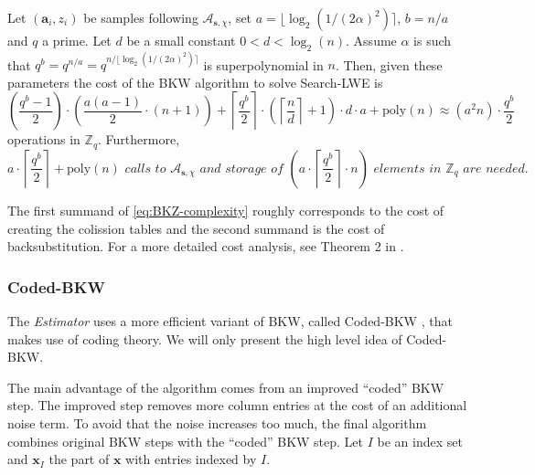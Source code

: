 \begin{theorem}
  Let $(\mathbf{a}_i, z_i)$ be samples following $\mathcal{A}_{\mathbf{s}, \chi}$, set $a = \lfloor \log_2(1/(2\alpha)^2)\rceil$, $b = n/a$ and $q$ a prime. Let $d$ be a small constant $0 < d < \log_2(n)$. Assume $\alpha$ is such that $q^b = q^{n/a} = q^{n/\lfloor \log_2(1/(2\alpha)^2)\rceil}$ is superpolynomial in $n$. Then, given these parameters the cost of the BKW algorithm to solve Search-LWE is
  \begin{equation}\label{eq:BKZ-complexity}
    \left(\frac{q^b-1}{2}\right) \cdot \left(\frac{a(a-1)}{2} \cdot (n + 1) \right) + \left\lceil\frac{q^b}{2}\right\rceil \cdot \left(\left\lceil\frac{n}{d}\right\rceil + 1\right) \cdot d \cdot a + \text{poly}(n) \approx (a^2 n) \cdot \frac{q^b}{2}
  \end{equation}
  operations in $\mathbb{Z}_q$. Furthermore,
  \begin{equation}
    a \cdot \left\lceil\frac{q^b}{2}\right\rceil + \text{poly}(n)\textit{ calls to } \mathcal{A}_{\mathbf{s}, \chi}\textit{ and storage of }  \left(a \cdot \left\lceil\frac{q^b}{2}\right\rceil \cdot n\right) \textit{ elements in } \mathbb{Z}_q \textit{ are needed.}
  \end{equation}
\end{theorem}

The first summand of \cref{eq:BKZ-complexity} roughly corresponds to the cost of creating the colission tables and the second summand is the cost of backsubstitution. For a more detailed cost analysis, see Theorem 2 in \cite{ACFFP15a}.


\subsubsection*{Coded-BKW \cite{GJS15}}
The \textit{Estimator} uses a more efficient variant of BKW, called Coded-BKW \cite{GJS15}, that makes use of coding theory. We will only present the high level idea of Coded-BKW.

The main advantage of the algorithm comes from an improved ``coded'' BKW step. The improved step removes more column entries at the cost of an additional noise term. To avoid that the noise increases too much, the final algorithm combines original BKW steps with the ``coded'' BKW step. Let $I$ be an index set and $\mathbf{x}_I$ the part of $\mathbf{x}$ with entries indexed by $I$.

